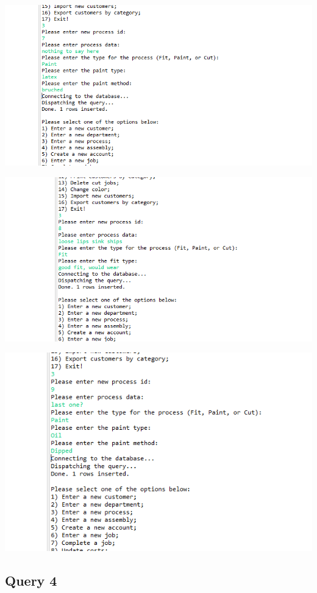 \documentclass[11pt]{article}
\begin{document}
\includegraphics[width = \textwidth]{process3.png}

\includegraphics[width = \textwidth]{process4.png}

\includegraphics[width = \textwidth]{process5.png}
\subsection{Query 4}%
\end{document}
